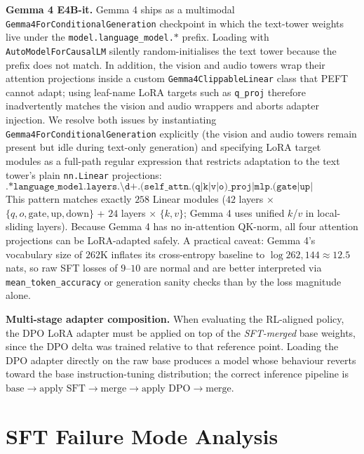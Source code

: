 \textbf{Gemma 4 E4B-it.} Gemma 4 ships as a multimodal \texttt{Gemma4ForConditionalGeneration} checkpoint in which the text-tower weights live under the \texttt{model.language\_model.$*$} prefix. Loading with \texttt{AutoModelForCausalLM} silently random-initialises the text tower because the prefix does not match. In addition, the vision and audio towers wrap their attention projections inside a custom \texttt{Gemma4ClippableLinear} class that PEFT cannot adapt; using leaf-name LoRA targets such as \texttt{q\_proj} therefore inadvertently matches the vision and audio wrappers and aborts adapter injection. We resolve both issues by instantiating \texttt{Gemma4ForConditionalGeneration} explicitly (the vision and audio towers remain present but idle during text-only generation) and specifying LoRA target modules as a full-path regular expression that restricts adaptation to the text tower's plain \texttt{nn.Linear} projections:
\begin{equation*}
\texttt{.*language\_model.layers.\textbackslash d+.(self\_attn.(q|k|v|o)\_proj|mlp.(gate|up|down)\_proj)\$}
\end{equation*}
This pattern matches exactly $258$ Linear modules ($42$ layers $\times$ $\{q, o, \text{gate}, \text{up}, \text{down}\}$ + $24$ layers $\times$ $\{k, v\}$; Gemma 4 uses unified $k$/$v$ in local-sliding layers). Because Gemma 4 has no in-attention QK-norm, all four attention projections can be LoRA-adapted safely. A practical caveat: Gemma 4's vocabulary size of $262$K inflates its cross-entropy baseline to $\log 262{,}144 \approx 12.5$\,nats, so raw SFT losses of $9$--$10$ are normal and are better interpreted via \texttt{mean\_token\_accuracy} or generation sanity checks than by the loss magnitude alone.

\textbf{Multi-stage adapter composition.} When evaluating the RL-aligned policy, the DPO LoRA adapter must be applied on top of the \emph{SFT-merged} base weights, since the DPO delta was trained relative to that reference point. Loading the DPO adapter directly on the raw base produces a model whose behaviour reverts toward the base instruction-tuning distribution; the correct inference pipeline is $\text{base} \to \text{apply SFT} \to \text{merge} \to \text{apply DPO} \to \text{merge}$.

\section{SFT Failure Mode Analysis}
\label{sec:failure_mode_appendix}

